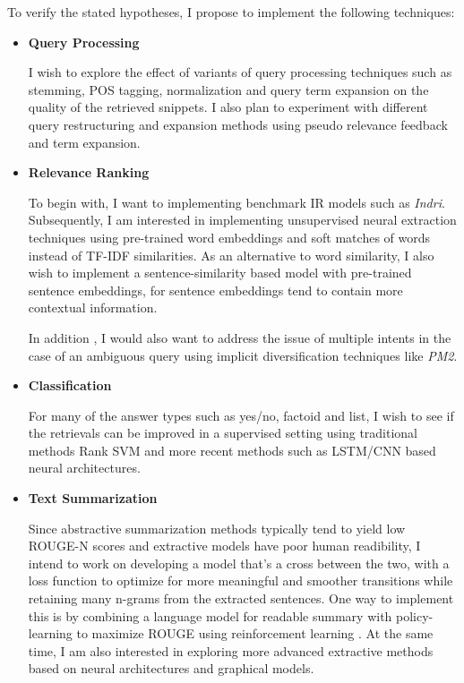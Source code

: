 \documentclass{article}
\begin{document}
To verify the stated hypotheses, I propose to implement the following techniques:

\begin{itemize}
\item \textbf{Query Processing}

I wish to explore the effect of variants of query processing techniques such as stemming, POS tagging, normalization and query term expansion on the quality of the retrieved snippets. I also plan to experiment with different query restructuring and expansion methods using pseudo relevance feedback and term expansion.

\item \textbf{Relevance Ranking}

To begin with, I want to implementing benchmark IR models such as \textit{Indri}. Subsequently, I am interested in implementing unsupervised neural extraction techniques using pre-trained word embeddings and soft matches of words instead of TF-IDF similarities. As an alternative to word similarity, I also wish to implement a sentence-similarity based model with pre-trained sentence embeddings, for sentence embeddings tend to contain more contextual information.

In addition , I would also want to address the issue of multiple intents in the case of an ambiguous query using implicit diversification techniques like \textit{PM2}.

\item \textbf{Classification}

For many of the answer types such as yes/no, factoid and list, I wish to see if the retrievals can be improved in a supervised setting using traditional methods Rank SVM and more recent methods such as LSTM/CNN based neural architectures.

\item \textbf{Text Summarization}

Since abstractive summarization methods typically tend to yield low ROUGE-N scores and extractive models have poor human readibility, I intend to work on developing a model that's a cross between the two, with a loss function to optimize for more meaningful and smoother transitions while retaining many n-grams from the extracted sentences. One way to implement this is by combining a language model for readable summary with policy-learning to maximize ROUGE using reinforcement learning \cite{DBLP}. At the same time, I am also interested in exploring more advanced extractive methods based on neural architectures and graphical models.

\end{itemize}
\end{document}
